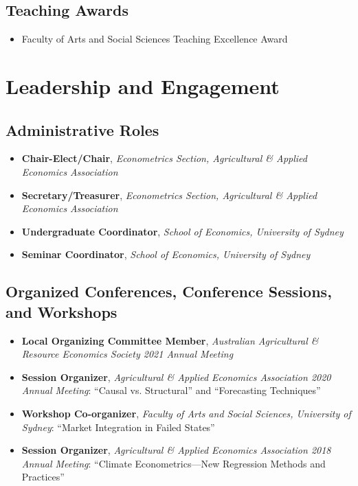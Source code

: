 \documentclass[10pt]{article}
\begin{document}
	\subsection*{Teaching Awards}	
	\begin{itemize}
		\item {} Faculty of Arts and Social Sciences Teaching Excellence Award
	\end{itemize}

	\bigskip

	\section*{Leadership and Engagement}
	
	\subsection*{Administrative Roles}
	\begin{itemize}
		\item {} \textbf{Chair-Elect/Chair}, \textsl{Econometrics Section, Agricultural \& Applied Economics Association}
		\item {} \textbf{Secretary/Treasurer}, \textsl{Econometrics Section, Agricultural \& Applied Economics Association}
		\item {} \textbf{Undergraduate Coordinator}, \textsl{School of Economics, University of Sydney}
		\item {} \textbf{Seminar Coordinator}, \textsl{School of Economics, University of Sydney}
	\end{itemize}
	
	\subsection*{Organized Conferences, Conference Sessions, and Workshops}
	\begin{itemize}
		\item {} \textbf{Local Organizing Committee Member}, \textsl{Australian Agricultural \& Resource Economics Society 2021 Annual Meeting}
		\item {} \textbf{Session Organizer}, \textsl{Agricultural \& Applied Economics Association 2020 Annual Meeting}: ``Causal vs. Structural'' and ``Forecasting Techniques''
		\item {} \textbf{Workshop Co-organizer}, \textsl{Faculty of Arts and Social Sciences, University of Sydney}: ``Market Integration in Failed States''
		\item {} \textbf{Session Organizer}, \textsl{Agricultural \& Applied Economics Association 2018 Annual Meeting}: ``Climate Econometrics---New Regression Methods and Practices''
	\end{itemize}
	
\end{document}
